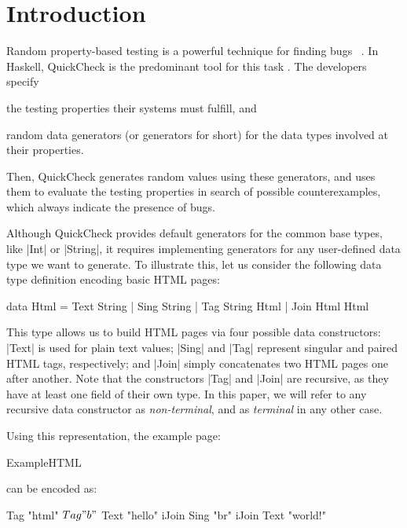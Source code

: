 \section{Introduction}
\label{sec:intro}

%
Random property-based testing is a powerful technique for finding bugs
~\cite{ArtsHNS15, HughesPAN16, HughesNSA16, MidtgaardJKNN17}.
%
In Haskell, QuickCheck is the predominant tool for this task \cite{ClaessenH00}.
%
The developers specify
%
\begin{inparaenum}[(i)]
\item the testing properties their systems must fulfill, and
\item random data generators (or generators for short) for the data types
  involved at their properties.
\end{inparaenum}
%
Then, QuickCheck generates random values using these generators, and uses them
to evaluate the testing properties in search of possible counterexamples, which
always indicate the presence of bugs.


%
Although QuickCheck provides default generators for the common base types, like
|Int| or |String|, it requires implementing generators for any user-defined data
type we want to generate.
%
%
To illustrate this, let us consider the following data type definition encoding
basic HTML pages:

\begin{code}
data Html  =  Text  String
           |  Sing  String
           |  Tag   String Html
           |  Join  Html Html
\end{code}
%
This type allows us to build HTML pages via four possible data constructors:
|Text| is used for plain text values; |Sing| and |Tag| represent singular and
paired HTML tags, respectively; and |Join| simply concatenates two HTML pages
one after another.
%
Note that the constructors |Tag| and |Join| are recursive, as they have at least
one field of their own type.
%
In this paper, we will refer to any recursive data constructor as
\emph{non-terminal}, and as \emph{terminal} in any other case.


Using this representation, the example page:

\begin{code}
ExampleHTML
\end{code}
%
can be encoded as:
%
\begin{code}
Tag "html" $ Tag "b" $
  Text "hello" iJoin Sing "br" iJoin Text "world!"
\end{code} %


